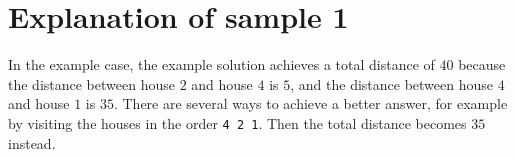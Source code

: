 \section*{Explanation of sample 1}
In the example case, the example solution achieves a total distance of $40$ because the distance between
house $2$ and house $4$ is $5$, and the distance between house $4$ and house $1$ is $35$. There are several
ways to achieve a better answer, for example by visiting the houses in the order \verb|4 2 1|. Then the total
distance becomes $35$ instead.
